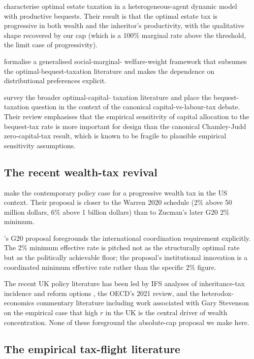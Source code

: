 \documentclass[11pt]{article}
\begin{document}
\citet{farhi2010progressive} characterise optimal estate taxation
in a heterogeneous-agent dynamic model with productive bequests.
Their result is that the optimal estate tax is progressive in
both wealth and the inheritor's productivity, with the qualitative
shape recovered by our cap (which is a 100\% marginal rate above
the threshold, the limit case of progressivity).

\citet{saez2018social} formalise a generalised social-marginal-
welfare-weight framework that subsumes the optimal-bequest-taxation
literature and makes the dependence on distributional preferences
explicit.

\citet{bastani2020capital} survey the broader optimal-capital-
taxation literature and place the bequest-taxation question in the
context of the canonical capital-vs-labour-tax debate.  Their
review emphasises that the empirical sensitivity of capital
allocation to the bequest-tax rate is more important for design
than the canonical Chamley-Judd zero-capital-tax result, which is
known to be fragile to plausible empirical sensitivity assumptions.

\subsection{The recent wealth-tax revival}

\citet{saez2019triumph} make the contemporary policy case for a
progressive wealth tax in the US context.  Their proposal is closer
to the Warren 2020 schedule (2\% above 50 million dollars, 6\% above
1 billion dollars) than to Zucman's later G20 2\% minimum.

\citet{zucman2024global}'s G20 proposal foregrounds the international
coordination requirement explicitly.  The 2\% minimum effective
rate is pitched not as the structurally optimal rate but as the
politically achievable floor; the proposal's institutional
innovation is a coordinated minimum effective rate rather than the
specific 2\% figure.

The recent UK policy literature has been led by IFS analyses of
inheritance-tax incidence and reform options
\citep[approximate citation;][]{ifs2023inheritance}, the OECD's
2021 review, and the heterodox-economics commentary literature
including work associated with Gary Stevenson on the empirical case
that high $r$ in the UK is the central driver of wealth
concentration.  None of these foreground the absolute-cap proposal
we make here.

\subsection{The empirical tax-flight literature}
\end{document}
